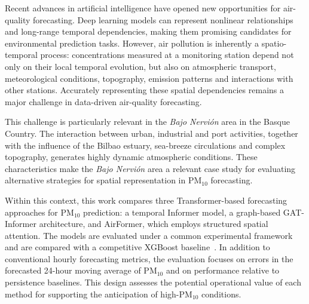 \documentclass[11pt]{article}
\newenvironment{revnewblock}{%
  \begingroup\color{orange!75!black}%
}{%
  \endgroup%
}
\begin{document}
\begin{revnewblock}
Recent advances in artificial intelligence have opened new opportunities for air-quality forecasting. Deep learning models can represent nonlinear relationships and long-range temporal dependencies, making them promising candidates for environmental prediction tasks. However, air pollution is inherently a spatio-temporal process: concentrations measured at a monitoring station depend not only on their local temporal evolution, but also on atmospheric transport, meteorological conditions, topography, emission patterns and interactions with other stations. Accurately representing these spatial dependencies remains a major challenge in data-driven air-quality forecasting.

This challenge is particularly relevant in the \textit{Bajo Nervi\'on} area in the Basque Country. The interaction between urban, industrial and port activities, together with the influence of the Bilbao estuary, sea-breeze circulations and complex topography, generates highly dynamic atmospheric conditions. These characteristics make the \textit{Bajo Nervi\'on} area a relevant case study for evaluating alternative strategies for spatial representation in PM$_{10}$ forecasting.

Within this context, this work compares three Transformer-based forecasting approaches for PM$_{10}$ prediction: a temporal Informer model, a graph-based GAT-Informer architecture, and AirFormer, which employs structured spatial attention. The models are evaluated under a common experimental framework and are compared with a competitive XGBoost baseline~\cite{Chen2016XGBoost}. In addition to conventional hourly forecasting metrics, the evaluation focuses on errors in the forecasted 24-hour moving average of PM$_{10}$ and on performance relative to persistence baselines. This design assesses the potential operational value of each method for supporting the anticipation of high-PM$_{10}$ conditions.


\end{revnewblock}
\end{document}
